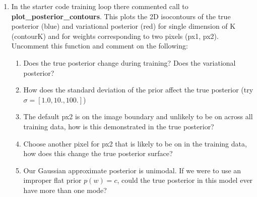 \documentclass{harvardml}
\theoremstyle{plain}
\begin{document}
\begin{problem}
\begin{enumerate}[label=(\alph*)]
\item In the starter code training loop there commented call to \textbf{plot\_posterior\_contours}.
This plots the 2D isocontours of the {\color{blue}true posterior (blue)} and {\color{red} variational posterior (red)} for single dimension of K (contourK) and for weights corresponding to two pixels (px1, px2).
Uncomment this function and comment on the following:
\begin{enumerate}[label=\roman*)]
  \item Does the true posterior change during training? Does the variational posterior?
  \item How does the standard deviation of the prior affect the true posterior (try $\sigma = [1.0,10.,100.]$)
  \item The default px2 is on the image boundary and unlikely to be on across all training data, how is this demonstrated in the true posterior?
  \item Choose another pixel for px2 that is likely to be on in the training data, how does this change the true posterior surface?
  \item Our Gaussian approximate posterior is unimodal.
  If we were to use an improper flat prior $p(w)=c$, could the true posterior in this model ever have more than one mode?
\end{enumerate}




\end{enumerate}
\end{problem}



\end{document}
